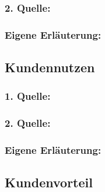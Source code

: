         \subsubsection*{2. Quelle:}
        \begin{abstract}
        \end{abstract}
        \subsubsection*{Eigene Erläuterung:}
        \begin{abstract}
        \end{abstract}
    \subsection{Kundennutzen}
        \subsubsection*{1. Quelle:}
        \begin{abstract}
        \end{abstract}
        \subsubsection*{2. Quelle:}
        \begin{abstract}
        \end{abstract}
        \subsubsection*{Eigene Erläuterung:}
        \begin{abstract}
        \end{abstract}
    \subsection{Kundenvorteil}
